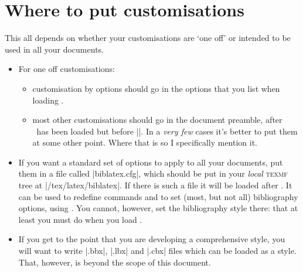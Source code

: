 \section{Where to put customisations}

This all depends on whether your customisations are `one off' or
intended to be used in all your documents.
\begin{itemize}
\item For one off customisations:
\begin{itemize}
\item customisation by options should go in the options that you list
  when loading \biblatex.
\item most other customisations should go in the document preamble, after
  \biblatex\ has been loaded but before ||. In a \emph{very
  few} cases it's better to put them at some other point. Where that is so
  I specifically mention it.
\end{itemize}
\item If you want a standard set of options to apply to all your
  documents, put them in a file called |biblatex.cfg|, which should be
  put in your \emph{local} \textsc{texmf} tree at
  |/tex/latex/biblatex|. If there is such a file it will be loaded
  after \biblatex. It can be used to redefine commands and to set
  (most, but not all) bibliography options, using
  . You
  cannot, however, set the bibliography style there: that at least you
  must do when you load \biblatex.
\item If you get to the point that you
  are developing a comprehensive style, you will want to write |.bbx|,
  |.lbx| and |.cbx| files which can be loaded as a style. That,
  however, is beyond the scope of this document.
\end{itemize}

